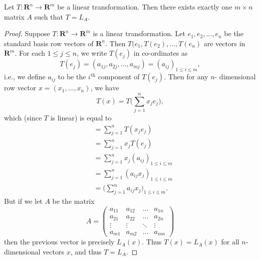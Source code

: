 \setcounter{theorem}{12}
\begin{lemma}\label{6.1.13}
    Let \(T : \mathbf{R}^n \to \mathbf{R}^m\) be a linear transformation.
    Then there exists exactly one \(m \times n\) matrix \(A\) such that \(T = L_A\).
\end{lemma}

\begin{proof}
    Suppose \(T : \mathbf{R}^n \to \mathbf{R}^m\) is a linear transformation.
    Let \(e_1, e_2, \dots, e_n\) be the standard basis row vectors of \(\mathbf{R}^n\).
    Then \(T(e_1, T(e_2), \dots, T(e_n)\) are vectors in \(\mathbf{R}^m\).
    For each \(1 \leq j \leq n\), we write \(T(e_j)\) in co-ordinates as
    \[
        T(e_j) = (a_{1j}, a_{2j}, \dots, a_{mj}) = (a_{ij})_{1 \leq i \leq m},
    \]
    i.e., we define \(a_{ij}\) to be the \(i^{\text{th}}\) component of \(T(e_j)\).
    Then for any \(n\)- dimensional row vector \(x = (x_1, \dots, x_n)\), we have
    \[
        T(x) = T\bigg(\sum_{j = 1}^n x_j e_j\bigg),
    \]
    which (since \(T\) is linear) is equal to
    \begin{align*}
         & = \sum_{j = 1}^n T(x_j e_j)                                \\
         & = \sum_{j = 1}^n x_j T(e_j)                                \\
         & = \sum_{j = 1}^n x_j (a_{ij})_{1 \leq i \leq m}            \\
         & = \sum_{j = 1}^n (a_{ij} x_j)_{1 \leq i \leq m}            \\
         & = \bigg(\sum_{j = 1}^n a_{ij} x_j\bigg)_{1 \leq i \leq m}.
    \end{align*}
    But if we let \(A\) be the matrix
    \[
        A = \begin{pmatrix}
            a_{11} & a_{12} & \dots  & a_{1n} \\
            a_{21} & a_{22} & \dots  & a_{2n} \\
            \vdots & \vdots & \ddots & \vdots \\
            a_{m1} & a_{m2} & \dots  & a_{mn}
        \end{pmatrix}
    \]
    then the previous vector is precisely \(L_A(x)\).
    Thus \(T(x) = L_A(x)\) for all \(n\)-dimensional vectors \(x\), and thus \(T = L_A\).


\end{proof}
